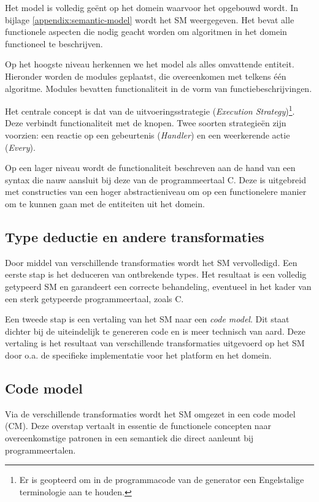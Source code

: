 Het model is volledig ge\"ent op het domein waarvoor het opgebouwd wordt. In
bijlage \ref{appendix:semantic-model} wordt het SM weergegeven. Het bevat alle
functionele aspecten die nodig geacht worden om algoritmen in het domein
functioneel te beschrijven.

Op het hoogste niveau herkennen we het model als alles omvattende entiteit.
Hieronder worden de modules geplaatst, die overeenkomen met telkens \'e\'en
algoritme. Modules bevatten functionaliteit in de vorm van
functiebeschrijvingen.

Het centrale concept is dat van de uitvoeringsstrategie (\emph{Execution
Strategy})\footnote{Er is geopteerd om in de programmacode van de generator een
Engelstalige terminologie aan te houden.}. Deze verbindt functionaliteit met de
knopen. Twee soorten strategie\"en zijn voorzien: een reactie op een
gebeurtenis (\emph{Handler}) en een weerkerende actie (\emph{Every}).

Op een lager niveau wordt de functionaliteit beschreven aan de hand van een
syntax die nauw aansluit bij deze van de programmeertaal C. Deze is uitgebreid
met constructies van een hoger abstractieniveau om op een functionelere manier
om te kunnen gaan met de entiteiten uit het domein.

\subsection{Type deductie en andere transformaties}

Door middel van verschillende transformaties wordt het SM vervolledigd. Een
eerste stap is het deduceren van ontbrekende types. Het resultaat is een
volledig getypeerd SM en garandeert een correcte behandeling, eventueel in het
kader van een sterk getypeerde programmeertaal, zoals C.

Een tweede stap is een vertaling van het SM naar een \emph{code model}. Dit
staat dichter bij de uiteindelijk te genereren code en is meer technisch van
aard. Deze vertaling is het resultaat van verschillende transformaties
uitgevoerd op het SM door o.a. de specifieke implementatie voor het platform en
het domein.

\subsection{Code model}
\label{subsection:arch-code-model}

Via de verschillende transformaties wordt het SM omgezet in een code model
(CM). Deze overstap vertaalt in essentie de functionele concepten naar
overeenkomstige patronen in een semantiek die direct aanleunt bij
programmeertalen.


